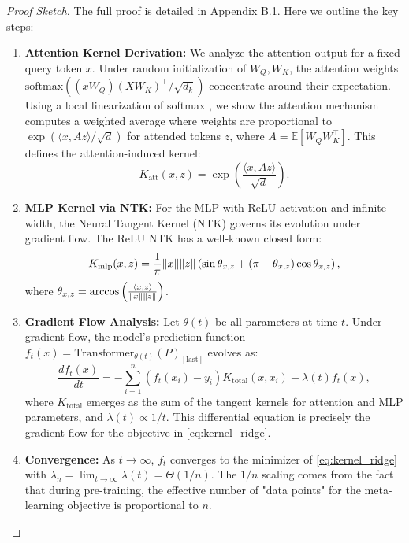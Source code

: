 	\begin{proof}[Proof Sketch]
		The full proof is detailed in Appendix B.1. Here we outline the key steps:
		\begin{enumerate}
\item \textbf{Attention Kernel Derivation:} We analyze the attention output for a fixed query token \(x\). Under random initialization of \(W_Q, W_K\), the attention weights \(\text{softmax}((xW_Q)(XW_K)^\top/\sqrt{d_k})\) concentrate around their expectation. Using a local linearization of softmax \citep{tsai2019transformer}, we show the attention mechanism computes a weighted average where weights are proportional to \(\exp(\langle x, A z \rangle / \sqrt{d})\) for attended tokens \(z\), where \(A = \mathbb{E}[W_Q W_K^\top]\). This defines the attention-induced kernel:
			\begin{equation}
				K_{\text{att}}(x, z) = \exp\left(\frac{\langle x, A z \rangle}{\sqrt{d}}\right).
				\label{eq:att_kernel}
			\end{equation}
			
			\item \textbf{MLP Kernel via NTK:} For the MLP with ReLU activation and infinite width, the Neural Tangent Kernel (NTK) \citep{jacot2018neural} governs its evolution under gradient flow. The ReLU NTK has a well-known closed form:
			\begin{equation}
				K_{\text{mlp}}(x, z) = \frac{1}{\pi} \lVert x \rVert \lVert z \rVert \left( \sin \theta_{x,z} + (\pi - \theta_{x,z}) \cos \theta_{x,z} \right),
				\label{eq:relu_ntk}
			\end{equation}
			where \(\theta_{x,z} = \arccos\left(\frac{\langle x, z \rangle}{\lVert x \rVert\lVert z \rVert}\right)\).
			
			\item \textbf{Gradient Flow Analysis:} Let \(\theta(t)\) be all parameters at time \(t\). Under gradient flow, the model's prediction function \(f_t(x) = \text{Transformer}_{\theta(t)}(P)_{[\text{last}]}\) evolves as:
			\begin{equation}
				\frac{df_t(x)}{dt} = -\sum_{i=1}^n (f_t(x_i) - y_i) K_{\text{total}}(x, x_i) - \lambda(t) f_t(x),
				\label{eq:gradient_flow}
			\end{equation}
			where \(K_{\text{total}}\) emerges as the sum of the tangent kernels for attention and MLP parameters, and \(\lambda(t) \propto 1/t\). This differential equation is precisely the gradient flow for the objective in \eqref{eq:kernel_ridge}.
			
			\item \textbf{Convergence:} As \(t \to \infty\), \(f_t\) converges to the minimizer of \eqref{eq:kernel_ridge} with \(\lambda_n = \lim_{t\to\infty} \lambda(t) = \Theta(1/n)\). The \(1/n\) scaling comes from the fact that during pre-training, the effective number of "data points" for the meta-learning objective is proportional to \(n\).
		\end{enumerate}
	\end{proof}
	
